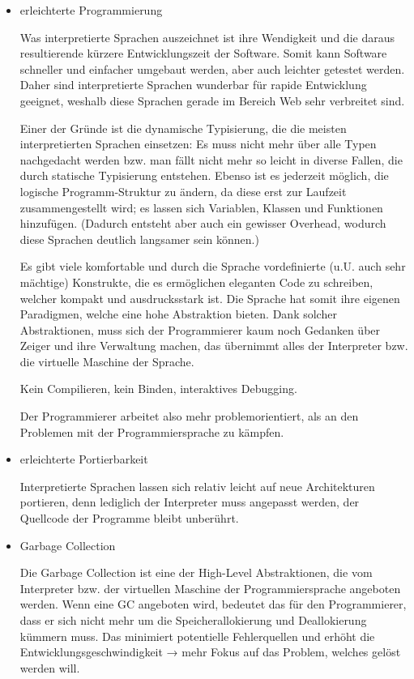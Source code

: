 \begin{itemize}

  \item erleichterte Programmierung

        Was interpretierte Sprachen auszeichnet ist ihre Wendigkeit und die
        daraus resultierende kürzere Entwicklungszeit der Software. Somit kann
        Software schneller und einfacher umgebaut werden, aber auch leichter
        getestet werden. Daher sind interpretierte Sprachen wunderbar für
        rapide Entwicklung geeignet, weshalb diese Sprachen gerade im Bereich
        Web sehr verbreitet sind.

        Einer der Gründe ist die dynamische Typisierung, die die meisten
        interpretierten Sprachen einsetzen: Es muss nicht mehr über alle Typen
        nachgedacht werden bzw. man fällt nicht mehr so leicht in diverse
        Fallen, die durch statische Typisierung entstehen. Ebenso ist es
        jederzeit möglich, die logische Programm-Struktur zu ändern, da diese
        erst zur Laufzeit zusammengestellt wird; es lassen sich Variablen,
        Klassen und Funktionen hinzufügen. (Dadurch entsteht aber auch ein
        gewisser Overhead, wodurch diese Sprachen deutlich langsamer sein
        können.)

        Es gibt viele komfortable und durch die Sprache vordefinierte (u.U.
        auch sehr mächtige) Konstrukte, die es ermöglichen eleganten Code zu
        schreiben, welcher kompakt und ausdrucksstark ist. Die Sprache hat
        somit ihre eigenen Paradigmen, welche eine hohe Abstraktion bieten.
        Dank solcher Abstraktionen, muss sich der Programmierer kaum  noch
        Gedanken über Zeiger und ihre Verwaltung machen, das übernimmt alles
        der Interpreter bzw. die virtuelle Maschine der Sprache.

        Kein Compilieren, kein Binden, interaktives Debugging.

        Der Programmierer arbeitet also mehr problemorientiert, als an den
        Problemen mit der Programmiersprache zu kämpfen.

  \item erleichterte Portierbarkeit

        Interpretierte Sprachen lassen sich relativ leicht auf neue
        Architekturen portieren, denn lediglich der Interpreter muss angepasst
        werden, der Quellcode der Programme bleibt unberührt.

  \item Garbage Collection

        Die Garbage Collection ist eine der High-Level Abstraktionen, die vom
        Interpreter bzw. der virtuellen Maschine der Programmiersprache
        angeboten werden. Wenn eine GC angeboten wird, bedeutet das für den
        Programmierer, dass er sich nicht mehr um die Speicherallokierung und
        Deallokierung kümmern muss. Das minimiert potentielle Fehlerquellen
        und erhöht die Entwicklungsgeschwindigkeit → mehr Fokus auf das
        Problem, welches gelöst werden will.

\end{itemize}


